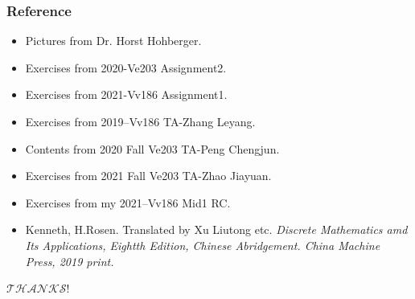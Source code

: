 \documentclass[xcolor=table]{beamer}
\newcommand{\myfont}{\rmfamily\normalsize\upshape\mdseries}
\begin{document}
\begin{frame}
    \frametitle{Reference}
    \begin{itemize}
        \item Pictures from Dr. Horst Hohberger.
        \item Exercises from 2020-Ve203 Assignment2.
        \item Exercises from 2021-Vv186 Assignment1.
        \item Exercises from 2019--Vv186 TA-Zhang Leyang.
        \item Contents from 2020 Fall Ve203 TA-Peng Chengjun.
        \item Exercises from 2021 Fall Ve203 TA-Zhao Jiayuan.
        \item Exercises from my 2021--Vv186 Mid1 RC.
        \item Kenneth, H.Rosen. Translated by Xu Liutong etc. \itshape Discrete Mathematics amd Its Applications\myfont, 
                 Eightth Edition, Chinese Abridgement. China Machine Press, 2019 print.
    \end{itemize}
\end{frame}

\begin{frame}
    \centering
    \Huge{$\mathcal{THANKS}$!}
\end{frame}
\end{document}
